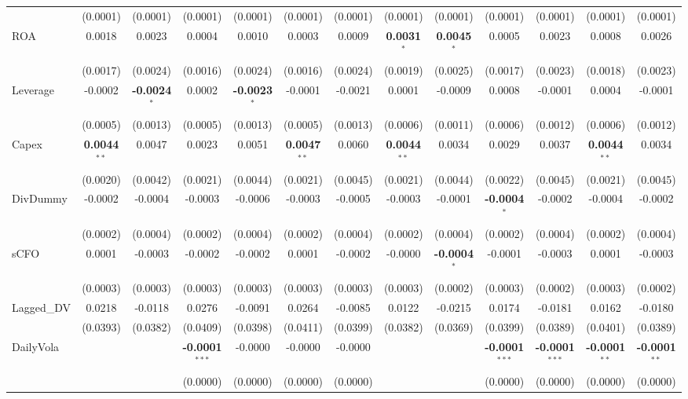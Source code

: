 \documentclass[11pt,a4paper]{article}
\begin{document}
\begin{table}[htbp]
\begin{tabular}{lcccccccccccc}
 & (0.0001) & (0.0001) & (0.0001) & (0.0001) & (0.0001) & (0.0001) & (0.0001) & (0.0001) & (0.0001) & (0.0001) & (0.0001) & (0.0001) \\
ROA & 0.0018 & 0.0023 & 0.0004 & 0.0010 & 0.0003 & 0.0009 & \textbf{0.0031}$^{*}$ & \textbf{0.0045}$^{*}$ & 0.0005 & 0.0023 & 0.0008 & 0.0026 \\
 & (0.0017) & (0.0024) & (0.0016) & (0.0024) & (0.0016) & (0.0024) & (0.0019) & (0.0025) & (0.0017) & (0.0023) & (0.0018) & (0.0023) \\
Leverage & -0.0002 & \textbf{-0.0024}$^{*}$ & 0.0002 & \textbf{-0.0023}$^{*}$ & -0.0001 & -0.0021 & 0.0001 & -0.0009 & 0.0008 & -0.0001 & 0.0004 & -0.0001 \\
 & (0.0005) & (0.0013) & (0.0005) & (0.0013) & (0.0005) & (0.0013) & (0.0006) & (0.0011) & (0.0006) & (0.0012) & (0.0006) & (0.0012) \\
Capex & \textbf{0.0044}$^{**}$ & 0.0047 & 0.0023 & 0.0051 & \textbf{0.0047}$^{**}$ & 0.0060 & \textbf{0.0044}$^{**}$ & 0.0034 & 0.0029 & 0.0037 & \textbf{0.0044}$^{**}$ & 0.0034 \\
 & (0.0020) & (0.0042) & (0.0021) & (0.0044) & (0.0021) & (0.0045) & (0.0021) & (0.0044) & (0.0022) & (0.0045) & (0.0021) & (0.0045) \\
DivDummy & -0.0002 & -0.0004 & -0.0003 & -0.0006 & -0.0003 & -0.0005 & -0.0003 & -0.0001 & \textbf{-0.0004}$^{*}$ & -0.0002 & -0.0004 & -0.0002 \\
 & (0.0002) & (0.0004) & (0.0002) & (0.0004) & (0.0002) & (0.0004) & (0.0002) & (0.0004) & (0.0002) & (0.0004) & (0.0002) & (0.0004) \\
sCFO & 0.0001 & -0.0003 & -0.0002 & -0.0002 & 0.0001 & -0.0002 & -0.0000 & \textbf{-0.0004}$^{*}$ & -0.0001 & -0.0003 & 0.0001 & -0.0003 \\
 & (0.0003) & (0.0003) & (0.0003) & (0.0003) & (0.0003) & (0.0003) & (0.0003) & (0.0002) & (0.0003) & (0.0002) & (0.0003) & (0.0002) \\
Lagged\_DV & 0.0218 & -0.0118 & 0.0276 & -0.0091 & 0.0264 & -0.0085 & 0.0122 & -0.0215 & 0.0174 & -0.0181 & 0.0162 & -0.0180 \\
 & (0.0393) & (0.0382) & (0.0409) & (0.0398) & (0.0411) & (0.0399) & (0.0382) & (0.0369) & (0.0399) & (0.0389) & (0.0401) & (0.0389) \\
DailyVola &  &  & \textbf{-0.0001}$^{***}$ & -0.0000 & -0.0000 & -0.0000 &  &  & \textbf{-0.0001}$^{***}$ & \textbf{-0.0001}$^{***}$ & \textbf{-0.0001}$^{**}$ & \textbf{-0.0001}$^{**}$ \\
 &  &  & (0.0000) & (0.0000) & (0.0000) & (0.0000) &  &  & (0.0000) & (0.0000) & (0.0000) & (0.0000) \\

\end{tabular}
\end{table}
\end{document}
